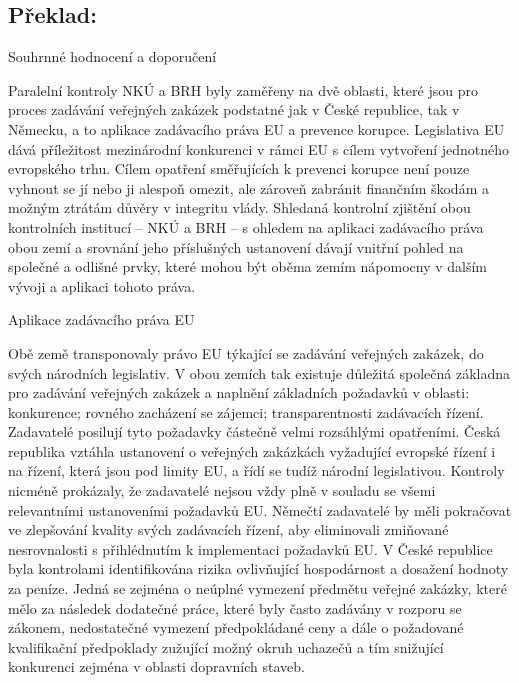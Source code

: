 \documentclass[10pt]{article}
\begin{document}
\pagebreak

\subsection*{Překlad:}



Souhrnné hodnocení a doporučení

Paralelní kontroly NKÚ a BRH byly zaměřeny na dvě oblasti, které jsou pro proces zadávání veřejných zakázek podstatné jak v České republice, tak v Německu, a to aplikace zadávacího práva EU a prevence korupce.
Legislativa EU dává příležitost mezinárodní konkurenci v rámci EU s cílem vytvoření jednotného evropského trhu.
Cílem opatření směřujících k prevenci korupce není pouze vyhnout se jí nebo ji alespoň omezit, ale zároveň zabránit finančním škodám a možným ztrátám důvěry v integritu vlády.
Shledaná kontrolní zjištění obou kontrolních institucí – NKÚ a BRH – s ohledem na aplikaci zadávacího práva obou zemí a srovnání jeho příslušných ustanovení dávají vnitřní pohled na společné a odlišné prvky, které mohou být oběma zemím nápomocny v dalším vývoji a aplikaci tohoto práva.


Aplikace zadávacího práva EU

Obě země transponovaly právo EU týkající se zadávání veřejných zakázek, do svých národních legislativ.
V obou zemích tak existuje důležitá společná základna pro zadávání veřejných zakázek a naplnění základních požadavků v oblasti: konkurence; rovného zacházení se zájemci; transparentnosti zadávacích řízení.
Zadavatelé posilují tyto požadavky částečně velmi rozsáhlými opatřeními.
Česká republika vztáhla ustanovení o veřejných zakázkách vyžadující evropské řízení i na řízení, která jsou pod limity EU, a řídí se tudíž národní legislativou.
Kontroly nicméně prokázaly, že zadavatelé nejsou vždy plně v souladu se všemi relevantními ustanoveními požadavků EU.
Němečtí zadavatelé by měli pokračovat ve zlepšování kvality svých zadávacích řízení, aby eliminovali zmiňované nesrovnalosti s přihlédnutím k implementaci požadavků EU.
V České republice byla kontrolami identifikována rizika ovlivňující hospodárnost a dosažení hodnoty za peníze.
Jedná se zejména o neúplné vymezení předmětu veřejné zakázky, které mělo za následek dodatečné práce, které byly často zadávány v rozporu se zákonem, nedostatečné vymezení předpokládané ceny a dále o požadované kvalifikační předpoklady zužující možný okruh uchazečů a tím snižující konkurenci zejména v oblasti dopravních staveb.
\end{document}
